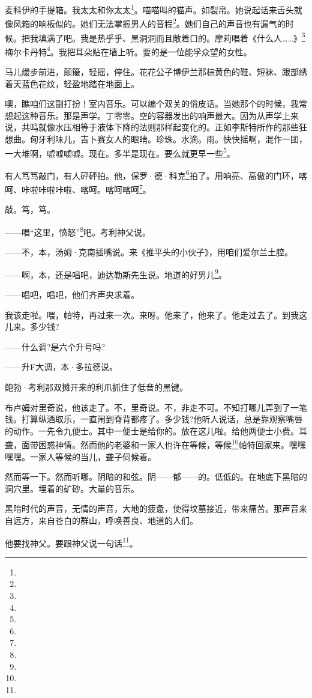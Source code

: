 \par 麦科伊的手提箱。我太太和你太太\footnote{}。喵喵叫的猫声。如裂帛。她说起话来舌头就像风箱的响板似的。她们无法掌握男人的音程\footnote{}。她们自己的声音也有漏气的时候。把我填满了吧。我是热乎乎、黑洞洞而且敞着口的。摩莉唱着《什么人……》\footnote{}梅尔卡丹特\footnote{}。我把耳朵贴在墙上听。要的是一位能孚众望的女性。
\par 马儿缓步前进，颠簸，轻摇，停住。花花公子博伊兰那棕黄色的鞋、短袜、跟部绣着天蓝色花纹，轻盈地踏在地面上。
\par 噢，瞧咱们这副打扮！室内音乐。可以编个双关的俏皮话。当她那个的时候，我常想起这种音乐。那是声学。丁零零。空的容器发出的响声最大。因为从声学上来说，共鸣就像水压相等于液体下降的法则那样起变化的。正如李斯特所作的那些狂想曲。匈牙利味儿，吉卜赛女人的眼睛。珍珠。水滴。雨。快快摇啊，混作一团，一大堆啊，嘘嘘嘘嘘。现在。多半是现在。要么就更早一些\footnote{}。
\par 有人笃笃敲门，有人砰砰拍。他，保罗·德·科克\footnote{}拍了。用响亮、高傲的门环，喀呵、咔啦咔啦咔啦、喀呵。喀呵喀呵\footnote{}。
\par 敲。笃，笃。
\par ——唱“这里，愤怒”\footnote{}吧。考利神父说。
\par ——不，本，汤姆·克南插嘴说。来《推平头的小伙子》，用咱们爱尔兰土腔。
\par ——啊，本，还是唱吧，迪达勒斯先生说。地道的好男儿\footnote{}。
\par ——唱吧，唱吧，他们齐声央求着。
\par 我该走啦。喂，帕特，再过来一次。来呀。他来了，他来了。他走过去了。到我这儿来。多少钱?
\par ——什么调?是六个升号吗?
\par ——升F大调，本·多拉德说。
\par 鲍勃·考利那双摊开来的利爪抓住了低音的黑键。
\par 布卢姆对里奇说，他该走了。不，里奇说。不，非走不可。不知打哪儿弄到了一笔钱。打算纵酒取乐，一直闹到脊背都疼了。多少钱?他听人说话，总是靠观察嘴唇的动作。一先令九便士。其中一便士是给你的。放在这儿啦。给他两便士小费。耳聋，面带困惑神情。然而他的老婆和一家人也许在等候，等候\footnote{}帕特回家来。嘿嘿嘿嘿。一家人等候的当儿，聋子伺候着。
\par 然而等一下。然而听哪。阴暗的和弦。阴——郁——的。低低的。在地底下黑暗的洞穴里。埋着的矿砂。大量的音乐。
\par 黑暗时代的声音，无情的声音，大地的疲惫，使得坟墓接近，带来痛苦。那声音来自远方，来自苍白的群山，呼唤善良、地道的人们。
\par 他要找神父。要跟神父说一句话\footnote{}。
